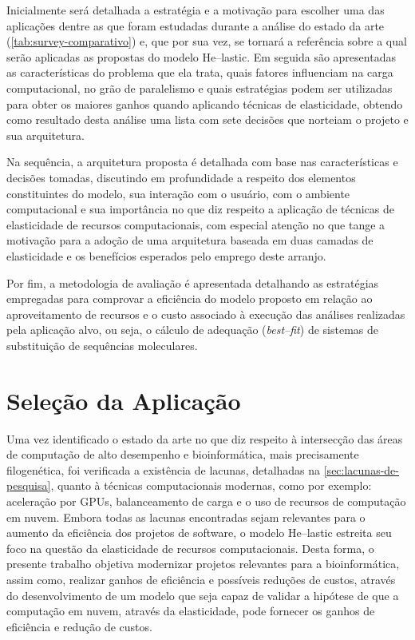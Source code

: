 \documentclass[english,brazilian]{UNISINOSmonografia} %
\begin{document}
Inicialmente será detalhada a estratégia e a motivação para escolher uma das aplicações dentre as que foram estudadas durante a análise do estado da arte (\autoref{tab:survey-comparativo}) e, que por sua vez, se tornará a referência sobre a qual serão aplicadas as propostas do modelo \textsf{He}--lastic.
Em seguida são apresentadas as características do problema que ela trata, quais fatores influenciam na carga computacional, no grão de paralelismo e quais estratégias podem ser utilizadas para obter os maiores ganhos quando aplicando técnicas de elasticidade, obtendo como resultado desta análise uma lista com sete decisões que norteiam o projeto e sua arquitetura.


Na sequência, a arquitetura proposta é detalhada com base nas características e decisões tomadas, discutindo em profundidade a respeito dos elementos constituintes do modelo, sua interação com o usuário, com o ambiente computacional e sua importância no que diz respeito a aplicação de técnicas de elasticidade de recursos computacionais, com especial atenção no que tange a motivação para a adoção de uma arquitetura baseada em duas camadas de elasticidade e os benefícios esperados pelo emprego deste arranjo.




Por fim, a metodologia de avaliação é apresentada detalhando as estratégias empregadas para comprovar a eficiência do modelo proposto em relação ao aproveitamento de recursos e o custo associado à execução das análises realizadas pela aplicação alvo, ou seja, o cálculo de adequação (\textit{best--fit}) de sistemas de substituição de sequências moleculares.




\section{Seleção da Aplicação} %
\label{sec:modelo-selecao}


Uma vez identificado o estado da arte no que diz respeito à intersecção das áreas de computação de alto desempenho e bioinformática, mais precisamente filogenética, foi verificada a existência de lacunas, detalhadas na \autoref{sec:lacunas-de-pesquisa}, quanto à técnicas computacionais modernas, como por exemplo: aceleração por GPUs, balanceamento de carga e o uso de recursos de computação em nuvem.
Embora todas as lacunas encontradas sejam relevantes para o aumento da eficiência dos projetos de software, o modelo \textsf{He}--lastic estreita seu foco na questão da elasticidade de recursos computacionais.
Desta forma, o presente trabalho objetiva modernizar projetos relevantes para a bioinformática, assim como, realizar ganhos de eficiência e possíveis reduções de custos, através do desenvolvimento de um modelo que seja capaz de validar a hipótese de que a computação em nuvem, através da elasticidade, pode fornecer os ganhos de eficiência e redução de custos.
\end{document}
